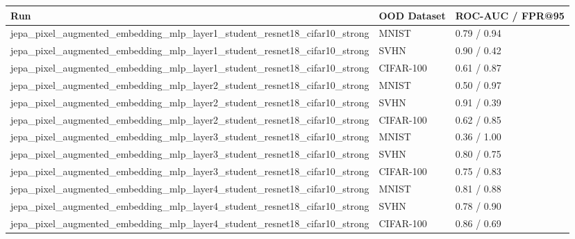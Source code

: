 \begin{tabular}{lll}
\toprule
Run & OOD Dataset & ROC-AUC / FPR@95 \\
\midrule
jepa\_pixel\_augmented\_embedding\_mlp\_layer1\_student\_resnet18\_cifar10\_strong & MNIST & 0.79 / 0.94 \\
jepa\_pixel\_augmented\_embedding\_mlp\_layer1\_student\_resnet18\_cifar10\_strong & SVHN & 0.90 / 0.42 \\
jepa\_pixel\_augmented\_embedding\_mlp\_layer1\_student\_resnet18\_cifar10\_strong & CIFAR-100 & 0.61 / 0.87 \\
jepa\_pixel\_augmented\_embedding\_mlp\_layer2\_student\_resnet18\_cifar10\_strong & MNIST & 0.50 / 0.97 \\
jepa\_pixel\_augmented\_embedding\_mlp\_layer2\_student\_resnet18\_cifar10\_strong & SVHN & 0.91 / 0.39 \\
jepa\_pixel\_augmented\_embedding\_mlp\_layer2\_student\_resnet18\_cifar10\_strong & CIFAR-100 & 0.62 / 0.85 \\
jepa\_pixel\_augmented\_embedding\_mlp\_layer3\_student\_resnet18\_cifar10\_strong & MNIST & 0.36 / 1.00 \\
jepa\_pixel\_augmented\_embedding\_mlp\_layer3\_student\_resnet18\_cifar10\_strong & SVHN & 0.80 / 0.75 \\
jepa\_pixel\_augmented\_embedding\_mlp\_layer3\_student\_resnet18\_cifar10\_strong & CIFAR-100 & 0.75 / 0.83 \\
jepa\_pixel\_augmented\_embedding\_mlp\_layer4\_student\_resnet18\_cifar10\_strong & MNIST & 0.81 / 0.88 \\
jepa\_pixel\_augmented\_embedding\_mlp\_layer4\_student\_resnet18\_cifar10\_strong & SVHN & 0.78 / 0.90 \\
jepa\_pixel\_augmented\_embedding\_mlp\_layer4\_student\_resnet18\_cifar10\_strong & CIFAR-100 & 0.86 / 0.69 \\
\bottomrule
\end{tabular}

